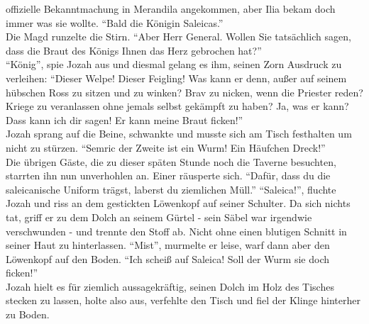 offizielle Bekanntmachung in Merandila angekommen, aber Ilia bekam doch immer was sie wollte. ``Bald 
die Königin Saleicas.''\\
Die Magd runzelte die Stirn. ``Aber Herr General. Wollen Sie tatsächlich sagen, dass die Braut des 
Königs Ihnen das Herz gebrochen hat?''\\
``König'', spie Jozah aus und diesmal gelang es ihm, seinen Zorn Ausdruck zu verleihen: ``Dieser 
Welpe! Dieser Feigling! Was kann er denn, außer auf seinem hübschen Ross zu sitzen und zu winken? 
Brav zu nicken, wenn die Priester reden? Kriege zu veranlassen ohne jemals selbst gekämpft zu 
haben? Ja, was er kann? Dass kann ich dir sagen! Er kann meine Braut ficken!''\\
Jozah sprang auf die Beine, schwankte und musste sich am Tisch festhalten um nicht zu stürzen. 
``Semric der Zweite ist ein Wurm! Ein Häufchen Dreck!''\\
Die übrigen Gäste, die zu dieser späten Stunde noch die Taverne besuchten, starrten ihn nun 
unverhohlen an. Einer räusperte sich. ``Dafür, dass du die saleicanische Uniform trägst, laberst du 
ziemlichen Müll.''
``Saleica!'', fluchte Jozah und riss an dem gestickten Löwenkopf auf seiner 
Schulter. Da sich nichts tat, griff er zu dem Dolch an seinem Gürtel - sein Säbel war irgendwie 
verschwunden - und trennte den Stoff ab. Nicht ohne einen blutigen Schnitt in seiner Haut zu 
hinterlassen. ``Mist'', murmelte er leise, warf dann aber den Löwenkopf auf den Boden. ``Ich scheiß 
auf Saleica! Soll der Wurm sie doch ficken!''\\
Jozah hielt es für ziemlich aussagekräftig, seinen Dolch im Holz des Tisches stecken zu lassen, 
holte also aus, verfehlte den Tisch und fiel der Klinge hinterher zu Boden.\\

